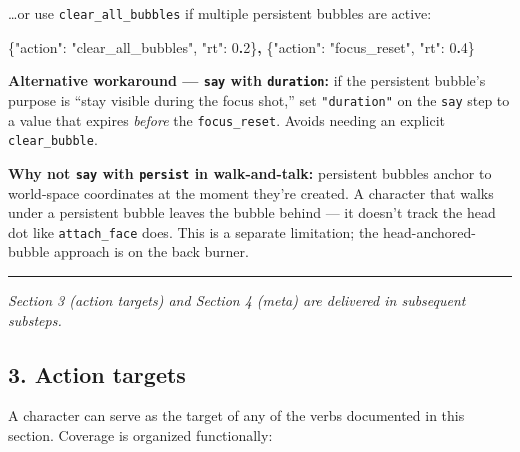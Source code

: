 \documentclass[
  11pt,
]{book}
\newenvironment{Shaded}{}{}
\newcommand{\DataTypeTok}[1]{\textcolor[rgb]{0.56,0.13,0.00}{#1}}
\newcommand{\DecValTok}[1]{\textcolor[rgb]{0.25,0.63,0.44}{#1}}
\newcommand{\ErrorTok}[1]{\textcolor[rgb]{1.00,0.00,0.00}{\textbf{#1}}}
\newcommand{\FunctionTok}[1]{\textcolor[rgb]{0.02,0.16,0.49}{#1}}
\newcommand{\StringTok}[1]{\textcolor[rgb]{0.25,0.44,0.63}{#1}}
\begin{document}
\ldots or use \texttt{clear\_all\_bubbles} if multiple persistent
bubbles are active:

\begin{Shaded}
\begin{Highlighting}[]
\FunctionTok{\{}\DataTypeTok{"action"}\FunctionTok{:} \StringTok{"clear\_all\_bubbles"}\FunctionTok{,} \DataTypeTok{"rt"}\FunctionTok{:} \DecValTok{0}\ErrorTok{.}\DecValTok{2}\FunctionTok{\}}\ErrorTok{,}
\FunctionTok{\{}\DataTypeTok{"action"}\FunctionTok{:} \StringTok{"focus\_reset"}\FunctionTok{,} \DataTypeTok{"rt"}\FunctionTok{:} \DecValTok{0}\ErrorTok{.}\DecValTok{4}\FunctionTok{\}}
\end{Highlighting}
\end{Shaded}

\textbf{Alternative workaround --- \texttt{say} with \texttt{duration}:}
if the persistent bubble's purpose is ``stay visible during the focus
shot,'' set \texttt{"duration"} on the \texttt{say} step to a value that
expires \emph{before} the \texttt{focus\_reset}. Avoids needing an
explicit \texttt{clear\_bubble}.

\textbf{Why not \texttt{say} with \texttt{persist} in walk-and-talk:}
persistent bubbles anchor to world-space coordinates at the moment
they're created. A character that walks under a persistent bubble leaves
the bubble behind --- it doesn't track the head dot like
\texttt{attach\_face} does. This is a separate limitation; the
head-anchored-bubble approach is on the back burner.

\begin{center}\rule{0.5\linewidth}{0.5pt}\end{center}

\emph{Section 3 (action targets) and Section 4 (meta) are delivered in
subsequent substeps.}

\subsection{3. Action targets}\label{action-targets}

A character can serve as the target of any of the verbs documented in
this section. Coverage is organized functionally:
\end{document}
